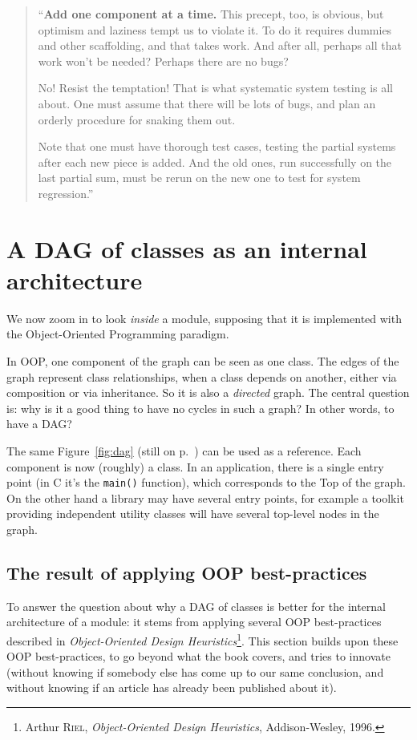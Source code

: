 \documentclass[a4paper,11pt]{article}
\begin{document}
\begin{quotation}
  ``\textbf{Add one component at a time.}\hspace{0.5cm} This precept, too, is obvious, but optimism and laziness tempt us to violate it. To do it requires dummies and other scaffolding, and that takes work. And after all, perhaps all that work won't be needed? Perhaps there are no bugs?

  No! Resist the temptation! That is what systematic system testing is all about. One must assume that there will be lots of bugs, and plan an orderly procedure for snaking them out.

  Note that one must have thorough test cases, testing the partial systems after each new piece is added. And the old ones, run successfully on the last partial sum, must be rerun on the new one to test for system regression.''
\end{quotation}

\section{A DAG of classes as an internal architecture}
\label{dag-of-classes}

We now zoom in to look \emph{inside} a module, supposing that it is implemented with the Object-Oriented Programming paradigm.

In OOP, one component of the graph can be seen as one class. The edges of the graph represent class relationships, when a class depends on another, either via composition or via inheritance. So it is also a \emph{directed} graph. The central question is: why is it a good thing to have no cycles in such a graph? In other words, to have a DAG?

The same Figure~\ref{fig:dag} (still on p.~\pageref{fig:dag}) can be used as a reference. Each component is now (roughly) a class. In an application, there is a single entry point (in C it's the \texttt{main()} function), which corresponds to the Top of the graph. On the other hand a library may have several entry points, for example a toolkit providing independent utility classes will have several top-level nodes in the graph.

\subsection{The result of applying OOP best-practices}

To answer the question about why a DAG of classes is better for the internal architecture of a module: it stems from applying several OOP best-practices described in \emph{Object-Oriented Design Heuristics}\footnote{
Arthur \textsc{Riel},
\emph{Object-Oriented Design Heuristics},
Addison-Wesley, 1996.
}. This section builds upon these OOP best-practices, to go beyond what the book covers, and tries to innovate (without knowing if somebody else has come up to our same conclusion, and without knowing if an article has already been published about it).
\end{document}
